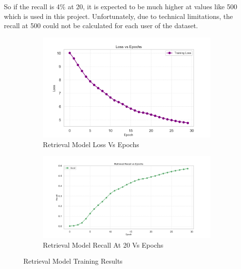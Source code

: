 So if the recall is 4\% at 20, it is expected to be much higher at values like 500 which is used in this project.
Unfortunately, due to technical limitations, the recall at 500 could not be calculated for each user of the dataset.

\begin{figure}[H]
    \centering
    \begin{subfigure}{.8\textwidth}
        \centering
        \includegraphics[width=\textwidth]{assets/retrieval_trianing_loss.png}
        \caption[Retrieval Model Loss]{Retrieval Model Loss Vs Epochs}
        \label{fig:RetrievalModelLoss}
    \end{subfigure}
    \bigskip
    \begin{subfigure}{.8\textwidth}
        \centering
        \includegraphics[width=\textwidth]{assets/retrieval_trianing_recall.png}
        \caption[Retrieval Model Recall]{Retrieval Model Recall At 20 Vs Epochs}
        \label{fig:RetrievalModelRecall}
    \end{subfigure}
    \caption[Retrieval Model Training]{Retrieval Model Training Results}
    \label{fig: RetrievalModelTraining}
\end{figure}

